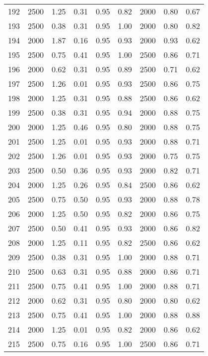 \begin{longtable}[c]{ccccccccc}
192 &  2500 &  1.25 &  0.31 &  0.95 &  0.82 &  2000 &  0.80 &  0.67 \\
193 &  2500 &  0.38 &  0.31 &  0.95 &  1.00 &  2000 &  0.80 &  0.82 \\
194 &  2000 &  1.87 &  0.16 &  0.95 &  0.93 &  2000 &  0.93 &  0.62 \\
195 &  2500 &  0.75 &  0.41 &  0.95 &  1.00 &  2500 &  0.86 &  0.71 \\
196 &  2000 &  0.62 &  0.31 &  0.95 &  0.89 &  2500 &  0.71 &  0.62 \\
197 &  2500 &  1.26 &  0.01 &  0.95 &  0.93 &  2500 &  0.86 &  0.75 \\
198 &  2000 &  1.25 &  0.31 &  0.95 &  0.88 &  2500 &  0.86 &  0.62 \\
199 &  2500 &  0.38 &  0.31 &  0.95 &  0.94 &  2000 &  0.88 &  0.75 \\
200 &  2000 &  1.25 &  0.46 &  0.95 &  0.80 &  2000 &  0.88 &  0.75 \\
201 &  2500 &  1.25 &  0.01 &  0.95 &  0.93 &  2000 &  0.88 &  0.71 \\
202 &  2500 &  1.26 &  0.01 &  0.95 &  0.93 &  2000 &  0.75 &  0.75 \\
203 &  2500 &  0.50 &  0.36 &  0.95 &  0.93 &  2000 &  0.82 &  0.71 \\
204 &  2000 &  1.25 &  0.26 &  0.95 &  0.84 &  2500 &  0.86 &  0.62 \\
205 &  2500 &  0.75 &  0.50 &  0.95 &  0.93 &  2000 &  0.88 &  0.78 \\
206 &  2000 &  1.25 &  0.50 &  0.95 &  0.82 &  2000 &  0.86 &  0.75 \\
207 &  2500 &  0.50 &  0.41 &  0.95 &  0.93 &  2000 &  0.86 &  0.82 \\
208 &  2000 &  1.25 &  0.11 &  0.95 &  0.82 &  2500 &  0.86 &  0.62 \\
209 &  2500 &  0.38 &  0.31 &  0.95 &  1.00 &  2000 &  0.88 &  0.71 \\
210 &  2500 &  0.63 &  0.31 &  0.95 &  0.88 &  2000 &  0.86 &  0.71 \\
211 &  2500 &  0.75 &  0.41 &  0.95 &  1.00 &  2000 &  0.88 &  0.71 \\
212 &  2000 &  0.62 &  0.31 &  0.95 &  0.80 &  2000 &  0.80 &  0.62 \\
213 &  2500 &  0.75 &  0.41 &  0.95 &  1.00 &  2000 &  0.88 &  0.88 \\
214 &  2000 &  1.25 &  0.01 &  0.95 &  0.82 &  2000 &  0.86 &  0.62 \\
215 &  2500 &  0.75 &  0.16 &  0.95 &  1.00 &  2500 &  0.86 &  0.71 \\

\end{longtable}
